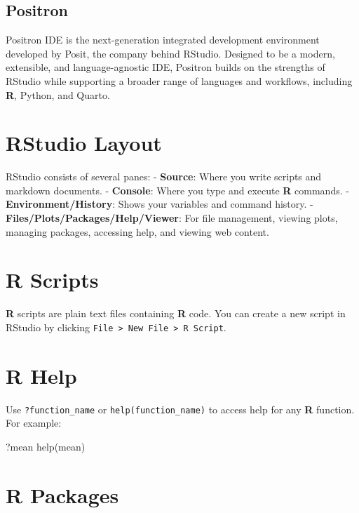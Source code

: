 \documentclass[
  letterpaper,
  DIV=11,
  numbers=noendperiod]{scrreprt}
\newenvironment{Shaded}{\begin{snugshade}}{\end{snugshade}}
\newcommand{\FunctionTok}[1]{\textcolor[rgb]{0.28,0.35,0.67}{#1}}
\newcommand{\NormalTok}[1]{\textcolor[rgb]{0.00,0.23,0.31}{#1}}
\begin{document}
\subsection{Positron}\label{positron}

Positron IDE is the next-generation integrated development environment
developed by Posit, the company behind RStudio. Designed to be a modern,
extensible, and language-agnostic IDE, Positron builds on the strengths
of RStudio while supporting a broader range of languages and workflows,
including \textbf{R}, Python, and Quarto.

\section{RStudio Layout}\label{rstudio-layout}

RStudio consists of several panes: - \textbf{Source}: Where you write
scripts and markdown documents. - \textbf{Console}: Where you type and
execute \textbf{R} commands. - \textbf{Environment/History}: Shows your
variables and command history. -
\textbf{Files/Plots/Packages/Help/Viewer}: For file management, viewing
plots, managing packages, accessing help, and viewing web content.

\section{R Scripts}\label{r-scripts}

\textbf{R} scripts are plain text files containing \textbf{R} code. You
can create a new script in RStudio by clicking
\texttt{File\ \textgreater{}\ New\ File\ \textgreater{}\ R\ Script}.

\section{R Help}\label{r-help}

Use \texttt{?function\_name} or \texttt{help(function\_name)} to access
help for any \textbf{R} function. For example:

\begin{Shaded}
\begin{Highlighting}[]
\NormalTok{?mean}
\FunctionTok{help}\NormalTok{(mean)}
\end{Highlighting}
\end{Shaded}

\section{R Packages}\label{r-packages}
\end{document}
